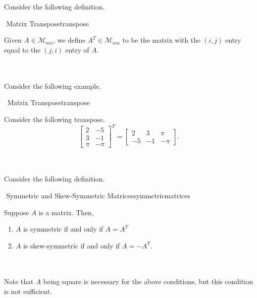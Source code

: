         \pagebreak
        \vphantom
        \\
        \\
        Consider the following definition.
        \begin{definition}{\Stop\,\,Matrix Transpose}{transpose}
        
            Given \(A\in\mathcal{M}_{mn}\), we define \(A^T\in\mathcal{M}_{nm}\) to be the matrix with the \((i,j)\) entry equal to the \((j,i)\) entry of \(A\).
        
        \end{definition}
        \vphantom
        \\
        \\
        Consider the following example.
        \begin{example}{\Difficulty\,\Difficulty\,\,Matrix Transpose}{transpose}
        
            Consider the following transpose.
            \begin{equation*}
                \begin{bmatrix} 2 & -5 \\ 3 & -1 \\ \pi & -\pi \end{bmatrix}^T=\begin{bmatrix} 2 & 3 & \pi \\ -5 & -1 & -\pi \end{bmatrix}.
            \end{equation*}
        
        \end{example}
        \vphantom
        \\
        \\
        Consider the following definition.
        \begin{definition}{\Stop\,\,Symmetric and Skew-Symmetric Matrices}{symmetricmatrices}
        
            Suppose \(A\) is a matrix. Then,
            \begin{enumerate}
                \item \(A\) is symmetric if and only if \(A=A^T\)
                \item \(A\) is skew-symmetric if and only if \(A=-A^T\).
            \end{enumerate}
            \vphantom
            \\
            \\
            Note that \(A\) being square is necessary for the above conditions, but this condition is not sufficient.
        
        \end{definition}

